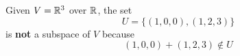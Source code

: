 \begin{example}
    Given $V = \mathbb{R}^3$ over $\mathbb{R}$, the set
    $$ U = \{(1, 0, 0), (1, 2, 3)\} $$
    is \textbf{not} a subspace of $V$ because
    $$ (1, 0, 0) + (1, 2, 3) \notin U $$
\end{example}